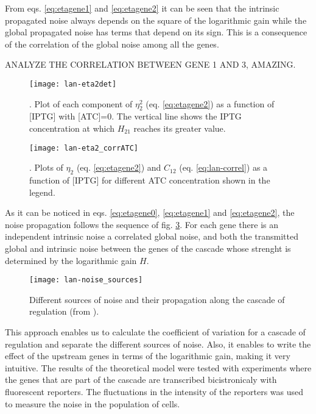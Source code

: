 From eqs. \eqref{eq:etagene1} and \eqref{eq:etagene2} it can be seen that the intrinsic propagated noise always depends on the square of the logarithmic gain while the global propagated noise has terms that depend on its sign. This is a consequence of the correlation of the global noise among all the genes.

ANALYZE THE CORRELATION BETWEEN GENE 1 AND 3, AMAZING.

\begin{figure}[H]
  \centering
  \texttt{[image: lan-eta2det]}
  \caption[Components of the noise]{\label{fig:lan-eta2det}. Plot of each component of $\eta_2^2$ (eq. \eqref{eq:etagene2}) as a function of [IPTG] with [ATC]=0. The vertical line shows the IPTG concentration at which $H_{21}$ reaches its greater value.}
\end{figure}


\begin{figure}[H]
  \centering
  \texttt{[image: lan-eta2\_corrATC]}
  \caption[Noise in gene $2$ for varying ATC concentrations]{\label{fig:lan-eta2_corrATC}. Plots of $\eta_2$ (eq. \eqref{eq:etagene2}) and $C_{12}$ (eq. \eqref{eq:lan-correl}) as a function of [IPTG] for different ATC concentration shown in the legend.}
\end{figure}

As it can be noticed in eqs. \eqref{eq:etagene0}, \eqref{eq:etagene1} and \eqref{eq:etagene2}, the noise propagation follows the sequence of fig. \ref{fig:lan-noise_sources}. For each gene there is an independent intrinsic noise a correlated global noise, and both the transmitted global and intrinsic noise between the genes of the cascade whose strenght is determined by the logarithmic gain $H$.

\begin{figure}[H]
  \centering
  \texttt{[image: lan-noise\_sources]}
  \caption[Propagation of noise through a cascade]{\label{fig:lan-noise_sources} Different sources of noise and their propagation along the cascade of regulation (from \cite{pedraza05}).}
\end{figure}


This approach enables us to calculate the coefficient of variation for a cascade of regulation and separate the different sources of noise. Also, it enables to write the effect of the upstream genes in terms of the logarithmic gain, making it very intuitive. The results of the theoretical model were tested with experiments where the genes that are part of the cascade are transcribed bicistronicaly with fluorescent reporters. The fluctuations in the intensity of the reporters was used to measure the noise in the population of cells.
